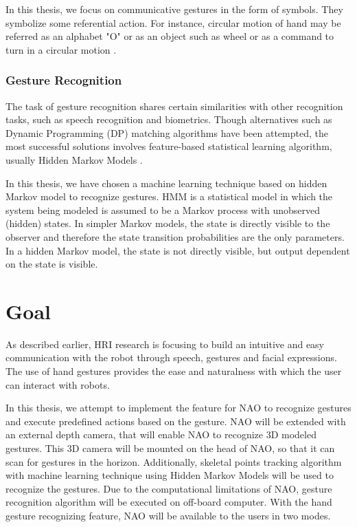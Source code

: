 In this thesis, we focus on communicative gestures in the form of symbols. They symbolize some referential action. For instance, circular motion of hand may be referred as an alphabet "O" or as an object such as wheel or as a command to turn in a circular motion .


\subsection{Gesture Recognition}
The task of gesture recognition shares certain similarities with other recognition tasks, such as speech recognition and biometrics. Though alternatives such as Dynamic Programming (DP) matching algorithms have been attempted, the most successful solutions involves feature-based statistical learning algorithm, usually Hidden Markov Models \cite{5}. 

In this thesis, we have chosen a machine learning technique based on hidden Markov model to recognize gestures. HMM is a statistical model in which the system being modeled is assumed to be a Markov process with unobserved (hidden) states. In simpler Markov models, the state is directly visible to the observer and therefore the state transition probabilities are the only parameters. In a hidden Markov model, the state is not directly visible, but output dependent on the state is visible.


\chapter{Goal} As described earlier, HRI research is focusing to build an intuitive and easy communication with the robot through speech, gestures and facial expressions. The use of hand gestures provides the ease and naturalness with which the user can interact with robots.

In this thesis, we attempt to implement the feature for NAO to recognize gestures and execute predefined actions based on the gesture. NAO will be extended with an external depth camera, that will enable NAO to recognize 3D modeled gestures. This 3D camera will be mounted on the head of NAO, so that it can scan for gestures in the horizon.  Additionally, skeletal points tracking algorithm with machine learning technique using Hidden Markov Models will be used to recognize the gestures. Due to the computational limitations of NAO, gesture recognition algorithm will be executed on off-board computer. With the hand gesture recognizing feature, NAO will be available to the users in two modes.


